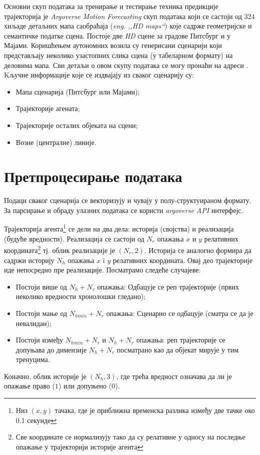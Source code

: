 \documentclass[11pt,oneside]{memoir}
\begin{document}
Основни скуп података за тренирање и тестирање техника предикције трајекторија је \textit{Argoverse Motion Forecasting} скуп података
који се састоји од 324 хиљаде детаљних мапа саобраћаја (\textit{eng. ,,HD maps``}) које садрже геометријске и семантичке податке сцена. Постоје две \textit{HD} сцене
за градове Питсбург и у Мајами. Коришћењем аутономних возила су генерисани сценарији који представљају неколико узастопних слика сцена (у табеларном формату)
на деловима мапа. Сви детаљи о овом скупу података се могу пронаћи на адреси 
\href{https://www.argoverse.org/index.html}{\color{blue}{www.argoverse.org}} \cite{argoverse}. \\


\noindent Kључне информације које се издвајају из сваког сценарију су:
\begin{itemize}
  \item Мапа сценарија (Питсбург или Мајами);
  \item Трајекторије агената;
  \item Трајекторије осталих објеката на сцени;
  \item Возне (централне) линије.
\end{itemize}

\section{Претпроцесирање података}

\noindent Подаци сваког сценарија се векторизују и чувају у полу-структуираном формату. 
За парсирање и обраду улазних података се користи \textit{argoverse API} интерфејс.


Трајекторија агента\footnote{Низ $(x, y)$ тачака, где је приближна временска разлика између две тачке око 0.1 секунде} 
се дели на два дела: историја (својства) и реализација (будуће вредности). Реализација се састоји од $N_r$ 
опажања $x$ и $y$ релативних координата\footnote{Све координате се нормализују тако да су релативне у односу на последње опажање у трајекторији историје агента} 
тј. облик реализације је $(N_r, 2)$. 
Историја се аналогно формира да садржи историју $N_h$ опажања $x$ i $y$ релативних координата. Овај део трајекторије иде непосредно
пре реализације. Посматрамо следеће случајеве:
\begin{itemize}
  \item Постоји више од $N_h + N_r$ опажања: Одбацује се реп трајекторије (првих неколико вредности хронолошки гледано);
  \item Постоји мање од $N_{hmin} + N_r$ опажања: Сценарио се одбацује (сматра се да је невалидан);
  \item Постоји између $N_{hmin} + N_r$ и $N_h + N_r$ опажања: реп трајекторије се допуњава до димензије $N_h + N_r$ 
  посматрано као да објекат мирује у тим тренуцима.
\end{itemize}
Коначно, облик историје је $(N_h, 3)$, где трећа вредност означава да ли је опажање право ($1$) или допуњено ($0$).
\end{document}
